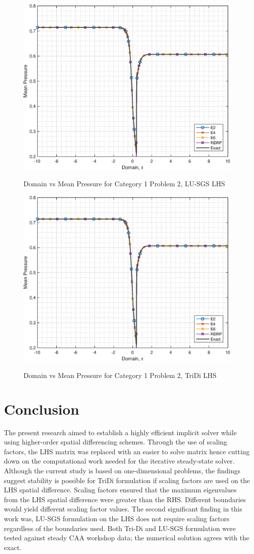 \documentclass[conf]{new-aiaa}
\begin{document}
\begin{figure}[hbtp!]
	\centering
	{\includegraphics[width=.7\textwidth]{Figures/LUSGS_C1P2}}
	\caption{Domain vs Mean Pressure for Category 1 Problem 2, LU-SGS LHS}
	\label{fig:LUSGS_C1P2}
\end{figure}

\begin{figure}[hbtp!]
	\centering
	{\includegraphics[width=.7\textwidth]{Figures/TriDi_C1P2}}
	\caption{Domain vs Mean Pressure for Category 1 Problem 2, TriDi LHS}
	\label{fig:TriDi_C1P2}
\end{figure}





\section{Conclusion}
The present research aimed to establish a highly efficient implicit solver while using higher-order spatial differencing schemes. 
Through the use of scaling factors, the LHS matrix was replaced with an easier to solve matrix hence cutting down on the computational work needed for the iterative steady-state solver. 
Although the current study is based on one-dimensional problems, the findings suggest stability is possible for TriDi formulation if scaling factors are used on the LHS spatial difference. 
Scaling factors ensured that the maximum eigenvalues from the LHS spatial difference were greater than the RHS.  
Different boundaries would yield different scaling factor values. 
The second significant finding in this work was, LU-SGS formulation on the LHS does not require scaling factors regardless of the boundaries used. 
Both Tri-Di and LU-SGS formulation were tested against steady CAA workshop data; the numerical solution agrees with the exact.  
\end{document}
